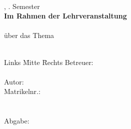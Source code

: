 \documentclass[12pt,oneside,titlepage,listof=totoc,bibliography=totoc]{scrartcl}
\begin{document}
\let\footnoteOld\footnote{}
\renewcommand{\footnote}[1]{%
        \linespread{1.0}
        \footnoteOld{#1}
        \linespread{1.2}
}

\renewcommand{\refname}{Literaturverzeichnis}   %



\begin{titlepage}
  \begin{center}
    \textbf{\myHochschulName}\\
    \myStudiengang, \mySemesterZahl. Semester\\
    \vspace{2cm}
    \textbf{Im Rahmen der Lehrveranstaltung}\\
    \textbf{\myLehrveranstaltung}\\
    \vspace{2cm}
    über das Thema\\
    \Huge{\myTitel}\\
    \vspace{0.2cm}
  \end{center}
  \normalsize
  \vfill
  \begin{tabbing}
    Links \= Mitte \= Rechts\kill
    Betreuer: \> \> \myBetreuer\\
    \> \> \\

    Autor: \> \> \myAutor\\
    \> \>  Matrikelnr.: \myMatrikelNr\\
    \> \> \myAdresse\\
    \> \> \\
    Abgabe: \> \> \myAbgabeDatum{}
  \end{tabbing}
\end{titlepage}
\end{document}
